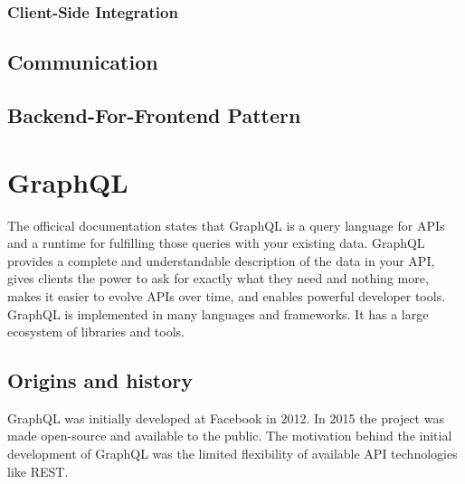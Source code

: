 \subsubsection{Client-Side Integration}

\subsection{Communication}

\subsection{Backend-For-Frontend Pattern}

\section{GraphQL}

The officical documentation states that GraphQL is a query language for APIs and a runtime for fulfilling those queries with your existing data. GraphQL provides a complete and understandable description of the data in your API, gives clients the power to ask for exactly what they need and nothing more, makes it easier to evolve APIs over time, and enables powerful developer tools. GraphQL is implemented in many languages and frameworks. It has a large ecosystem of libraries and tools.

\subsection{Origins and history}

GraphQL was initially developed at Facebook in 2012. In 2015 the project was made open-source and available to the public. The motivation behind the initial development of GraphQL was the limited flexibility of available API technologies like REST.

